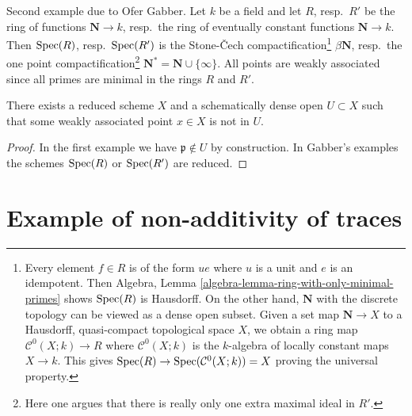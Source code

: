 \medskip\noindent
Second example due to Ofer Gabber. Let $k$ be a field and let
$R$, resp.\ $R'$ be the ring of functions $\mathbf{N} \to k$, resp.\ the ring
of eventually constant functions $\mathbf{N} \to k$. Then $\mathop{\mathrm{Spec}}(R)$,
resp.\ $\mathop{\mathrm{Spec}}(R')$ is the
Stone-{\v C}ech compactification\footnote{Every element $f \in R$ is of
the form $ue$ where $u$ is a unit and $e$ is an idempotent. Then
Algebra, Lemma \ref{algebra-lemma-ring-with-only-minimal-primes}
shows $\mathop{\mathrm{Spec}}(R)$ is Hausdorff. On the other hand, $\mathbf{N}$ with the
discrete topology can be viewed as a dense open subset. Given a set map
$\mathbf{N} \to X$ to a Hausdorff, quasi-compact topological space $X$,
we obtain a ring map $\mathcal{C}^0(X; k) \to R$ where $\mathcal{C}^0(X; k)$
is the $k$-algebra of locally constant maps $X \to k$. This gives
$\mathop{\mathrm{Spec}}(R) \to \mathop{\mathrm{Spec}}(\mathcal{C}^0(X; k)) = X$ proving the universal
property.} $\beta\mathbf{N}$, resp.\ the
one point compactification\footnote{Here one argues that there is really
only one extra maximal ideal in $R'$.}
$\mathbf{N}^* = \mathbf{N} \cup \{\infty\}$.
All points are weakly associated since all primes are minimal in the
rings $R$ and $R'$.

\begin{lemma}
\label{lemma-example-schematically-dense-missing-weakly-associated-point}
There exists a reduced scheme $X$ and a schematically dense open
$U \subset X$ such that some weakly associated point $x \in X$ is not in $U$.
\end{lemma}

\begin{proof}
In the first example we have $\mathfrak p \not \in U$ by construction.
In Gabber's examples the schemes $\mathop{\mathrm{Spec}}(R)$ or $\mathop{\mathrm{Spec}}(R')$ are reduced.
\end{proof}



\section{Example of non-additivity of traces}
\label{section-non-additive}


